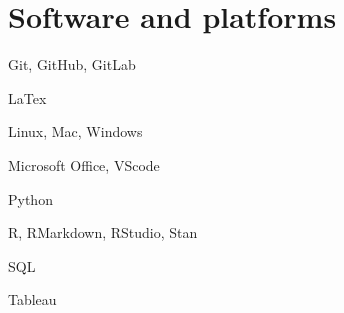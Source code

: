 \documentclass[letterpaper]{resume_config}
\begin{document}
\section{Software and platforms}
\begin{SkillsList}
	\item Git, GitHub, GitLab 
	\item LaTex
    \item Linux, Mac, Windows
    \item Microsoft Office, VScode
	\item Python
    \item R, RMarkdown, RStudio, Stan 
    \item SQL
    \item Tableau 
\end{SkillsList}
%
%
%
\end{document}
